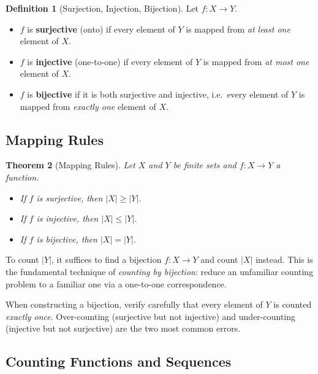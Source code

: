 \documentclass[11pt, a4paper, notitlepage]{report}
\newtheorem{theorem}{Theorem}[section]
\theoremstyle{definition}
\newtheorem{definition}[theorem]{Definition}
\theoremstyle{remark}
\begin{document}
\begin{definition}[Surjection, Injection, Bijection]
\label{def:bij}
Let $f: X \to Y$.
\begin{itemize}
  \item $f$ is \textbf{surjective} (onto) if every element of $Y$ is mapped from \emph{at least
    one} element of $X$.
  \item $f$ is \textbf{injective} (one-to-one) if every element of $Y$ is mapped from \emph{at
    most one} element of $X$.
  \item $f$ is \textbf{bijective} if it is both surjective and injective, i.e.\ every element
    of $Y$ is mapped from \emph{exactly one} element of $X$.
\end{itemize}
\end{definition}

\subsection{Mapping Rules}

\begin{theorem}[Mapping Rules]
\label{thm:mapping}
Let $X$ and $Y$ be finite sets and $f: X \to Y$ a function.
\begin{itemize}
  \item If $f$ is surjective, then $|X| \geq |Y|$.
  \item If $f$ is injective, then $|X| \leq |Y|$.
  \item If $f$ is bijective, then $|X| = |Y|$.
\end{itemize}
\end{theorem}

\begin{keyresult}[title={Key Result: Bijections and Counting}]
To count $|Y|$, it suffices to find a bijection $f: X \to Y$ and count $|X|$ instead. This is
the fundamental technique of \emph{counting by bijection}: reduce an unfamiliar counting
problem to a familiar one via a one-to-one correspondence.
\end{keyresult}

\begin{warning}[title={Warning: Over- and Under-Counting}]
When constructing a bijection, verify carefully that every element of $Y$ is counted
\emph{exactly once}. Over-counting (surjective but not injective) and under-counting
(injective but not surjective) are the two most common errors.
\end{warning}

\subsection{Counting Functions and Sequences}
\end{document}
